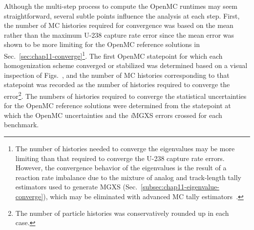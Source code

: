
Although the multi-step process to compute the OpenMC runtimes may seem straightforward, several subtle points influence the analysis at each step. First, the number of \ac{MC} histories required for convergence was based on the mean rather than the maximum U-238 capture rate error since the mean error was shown to be more limiting for the OpenMC reference solutions in Sec.~\ref{sec:chap11-converge}\footnote{The number of histories needed to converge the eigenvalues may be more limiting than that required to converge the U-238 capture rate errors. However, the convergence behavior of the eigenvalues is the result of a reaction rate imbalance due to the mixture of analog and track-length tally estimators used to generate \ac{MGXS} (Sec.~\ref{subsec:chap11-eigenvalue-converge}), which may be eliminated with advanced \ac{MC} tally estimators~\cite{nelson2014improved}.}. The first OpenMC statepoint for which each homogenization scheme converged or stabilized was determined based on a visual inspection of Figs.~, and the number of \ac{MC} histories corresponding to that statepoint was recorded as the number of histories required to converge the error\footnote{The number of particle histories was conservatively rounded up in each case.}. The numbers of histories required to converge the statistical uncertainties for the OpenMC reference solutions were determined from the statepoint at which the OpenMC uncertainties and the \textit{i}\ac{MGXS} errors crossed for each benchmark.

